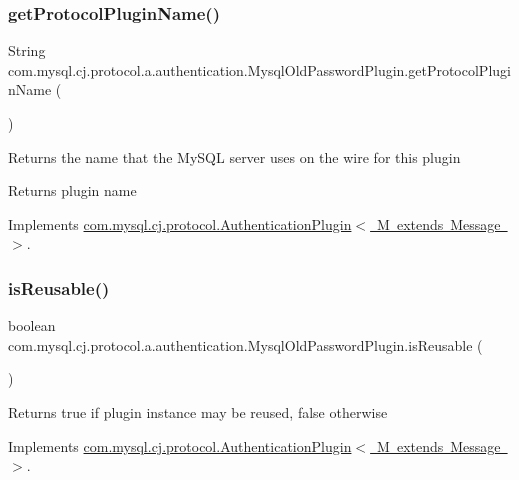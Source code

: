 \subsubsection{\texorpdfstring{get\+Protocol\+Plugin\+Name()}{getProtocolPluginName()}}
{\footnotesize\ttfamily String com.\+mysql.\+cj.\+protocol.\+a.\+authentication.\+Mysql\+Old\+Password\+Plugin.\+get\+Protocol\+Plugin\+Name (\begin{DoxyParamCaption}{ }\end{DoxyParamCaption})}

Returns the name that the My\+S\+QL server uses on the wire for this plugin

\begin{DoxyReturn}{Returns}
plugin name 
\end{DoxyReturn}


Implements \mbox{\hyperlink{interfacecom_1_1mysql_1_1cj_1_1protocol_1_1_authentication_plugin_ab428486b799598c36f4506c95ff5b94b}{com.\+mysql.\+cj.\+protocol.\+Authentication\+Plugin$<$ M extends Message $>$}}.

\mbox{\label{classcom_1_1mysql_1_1cj_1_1protocol_1_1a_1_1authentication_1_1_mysql_old_password_plugin_a9d16dfa8345a0c98297c3e1ddd01924e}} 
\subsubsection{\texorpdfstring{is\+Reusable()}{isReusable()}}
{\footnotesize\ttfamily boolean com.\+mysql.\+cj.\+protocol.\+a.\+authentication.\+Mysql\+Old\+Password\+Plugin.\+is\+Reusable (\begin{DoxyParamCaption}{ }\end{DoxyParamCaption})}

\begin{DoxyReturn}{Returns}
true if plugin instance may be reused, false otherwise 
\end{DoxyReturn}


Implements \mbox{\hyperlink{interfacecom_1_1mysql_1_1cj_1_1protocol_1_1_authentication_plugin_afff2eda7e67e6847d2401461100e2c69}{com.\+mysql.\+cj.\+protocol.\+Authentication\+Plugin$<$ M extends Message $>$}}.

